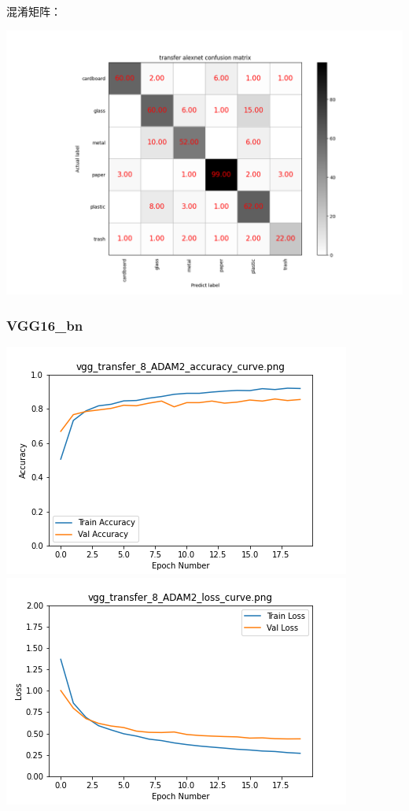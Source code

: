 \documentclass[UTF8]{ctexart}
\begin{document}
混淆矩阵：

\includegraphics[scale=0.5]{cm/alexnet.png} 

\subsubsection{VGG16\_bn}
 \includegraphics[scale=0.5]{image/vgg_transfer_8_ADAM2_accuracy_curve.png} 
 \includegraphics[scale=0.5]{image/vgg_transfer_8_ADAM2_loss_curve.png} 
\end{document}
